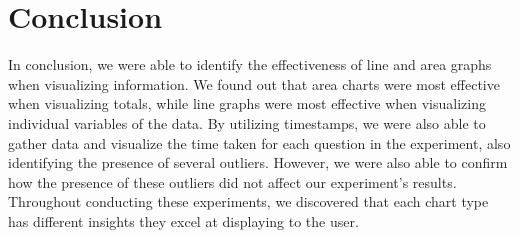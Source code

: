 \section{Conclusion}
\quad In conclusion, we were able to identify the effectiveness of line and area graphs when visualizing information. We found out that area charts were most effective when visualizing totals, while line graphs were most effective when visualizing individual variables of the data. By utilizing timestamps, we were also able to gather data and visualize the time taken for each question in the experiment, also identifying the presence of several outliers. However, we were also able to confirm how the presence of these outliers did not affect our experiment's results. Throughout conducting these experiments, we discovered that each chart type has different insights they excel at displaying to the user.